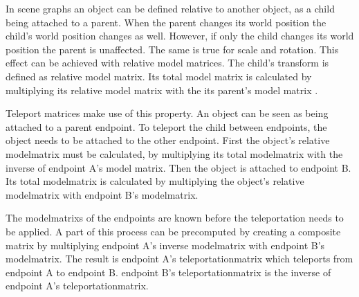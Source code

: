 In scene graphs an object can be defined relative to another object, as a child being attached to a parent. When the parent changes its world position the child's world position changes as well. However, if only the child changes its world position the parent is unaffected. The same is true for scale and rotation. This effect can be achieved with relative model matrices. The child's transform is defined as relative model matrix. Its total model matrix is calculated by multiplying its relative model matrix with the its parent's model matrix \cite{akine:2018:realtime}.

Teleport matrices make use of this property. An object can be seen as being attached to a parent \gls{endpoint}. To teleport the child between endpoints, the object needs to be attached to the other endpoint. First the object's relative \gls{modelmatrix} must be calculated, by multiplying its total \gls{modelmatrix} with the inverse of \gls{endpoint} A's model matrix. Then the object is attached to \gls{endpoint} B. Its total \gls{modelmatrix} is calculated by multiplying the object's relative \gls{modelmatrix} with \gls{endpoint} B's \gls{modelmatrix}.

The \glspl{modelmatrix} of the \glspl{endpoint} are known before the teleportation needs to be applied. A part of this process can be precomputed by creating a composite matrix by multiplying \gls{endpoint} A's inverse \gls{modelmatrix} with \gls{endpoint} B's \gls{modelmatrix}. The result is \gls{endpoint} A's \gls{teleportationmatrix} which teleports from \gls{endpoint} A to \gls{endpoint} B. \Gls{endpoint} B's \gls{teleportationmatrix} is the inverse of \gls{endpoint} A's \gls{teleportationmatrix}.







